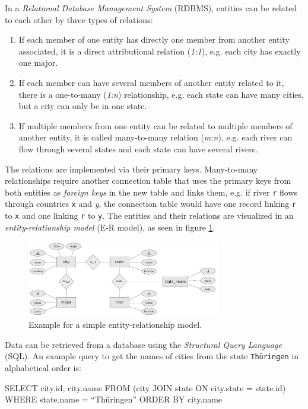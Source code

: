 In a \emph{Relational Database Management System} (RDBMS), entities can be related to each other by three types of relations:
\begin{enumerate}
  \item If each member of one entity has directly one member from another entity associated, it is a direct attributional relation (\emph{1:1}), e.g. each city has exactly one major.
  \item If each member can have several members of another entity related to it, there is a one-to-many (\emph{1:n}) relationship, e.g. each state can have many cities, but a city can only be in one state.
  \item If multiple members from one entity can be related to multiple members of another entity, it is called many-to-many relation (\emph{m:n}), e.g. each river can flow through several states and each state can have several rivers.
\end{enumerate}
The relations are implemented via their primary keys. Many-to-many relationships require another connection table that uses the primary keys from both entities as \emph{foreign keys} in the new table and links them, e.g. if river \texttt{r} flows through countries \texttt{x} and \emph{y}, the connection table would have one record linking \texttt{r} to \texttt{x} and one linking \texttt{r} to \texttt{y}. The entities and their relations are visualized in an \emph{entity-relationship model} (E-R model), as seen in figure \ref{fig:er_example}.

\begin{figure}[ht]
  \centering
  \includegraphics[width=0.75\textwidth]{graphics/basics/er_example}
  \caption{Example for a simple entity-relationship model.}
  \label{fig:er_example}
\end{figure}

Data can be retrieved from a database using the \emph{Structural Query Language} (SQL). An example query to get the names of cities from the state \texttt{Thüringen} in alphabetical order is:
\begin{verbatimtab}
  SELECT     city.id, city.name
  FROM       (city JOIN state ON city.state = state.id)
  WHERE      state.name = ``Thüringen''
  ORDER BY   city.name
\end{verbatimtab}

